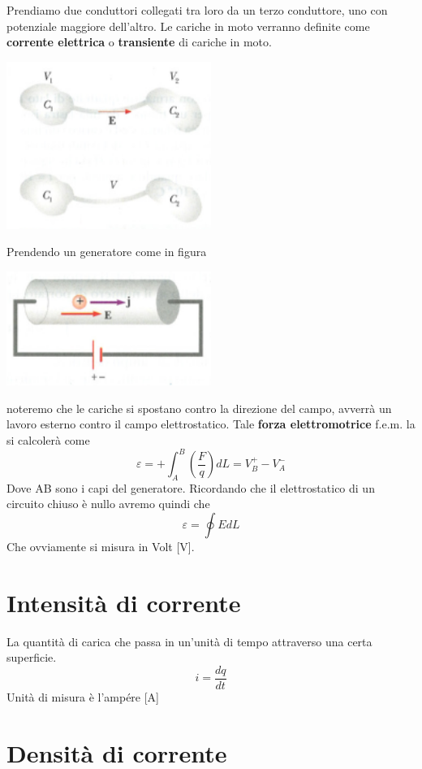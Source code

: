 \documentclass[a4paper, 12pt]{book}
\theoremstyle{plain}
\begin{document}
Prendiamo due conduttori collegati tra loro da un terzo conduttore,
uno con potenziale maggiore dell'altro. Le cariche in moto 
verranno definite come \textbf{corrente elettrica} o 
\textbf{transiente} di cariche in moto.
\begin{center}
    \includegraphics[width=0.5\textwidth]{conduttori_corrente.png}
\end{center}
Prendendo un generatore come in figura
\begin{center}
    \includegraphics[width=0.5\textwidth]{gener.png}
\end{center}
noteremo che le cariche si spostano contro la direzione del 
campo, avverrà un lavoro esterno contro il campo 
elettrostatico. Tale \textbf{forza elettromotrice}
f.e.m. la si calcolerà come
\[
    \varepsilon = + \int_A^B (\frac{F}{q}) dL = V_B^+ - V_A^-
\]
Dove AB sono i capi del generatore. Ricordando che 
il elettrostatico di un circuito chiuso è nullo avremo quindi 
che
\[
    \varepsilon = \oint E dL
\]
Che ovviamente si misura in Volt [V].

\section{Intensità di corrente}

La quantità di carica che passa in un'unità di tempo 
attraverso una certa superficie.
\[
    i = \frac{dq}{dt}
\]
Unità di misura è l'ampére [A]

\section{Densità di corrente}
\end{document}
